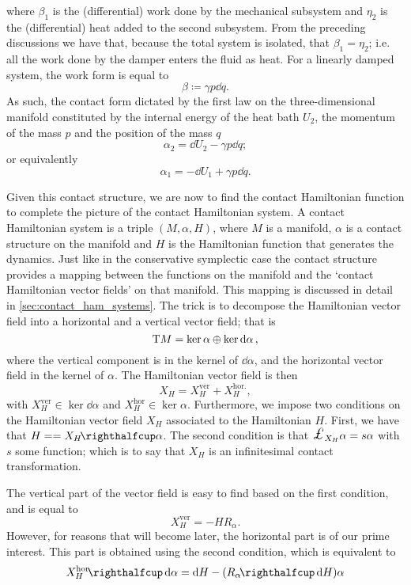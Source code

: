where $\beta_1$ is the (differential) work done by the mechanical subsystem and $\eta_2$ is the (differential) heat added to the second subsystem. From the preceding discussions we have that, because the total system is isolated, that $ \beta_1 = \eta_2 $; i.e. all the work done by the damper enters the fluid as heat. For a linearly damped system, the work form is equal to 
$$ \beta \coloneq \gamma p \dd{q}. $$
As such, the contact form dictated by the first law on the three-dimensional manifold constituted by the internal energy of the heat bath $U_2$, the momentum of the mass $p$ and the position of the mass $q$
\begin{equation}
    \alpha_2 = \dd{U}_2 - \gamma p \dd{q};
    \label{eq:dho_contact_form_thermo}
\end{equation}
or equivalently
\begin{equation*}
    \alpha_1 = -\dd{U}_1 + \gamma p \dd{q}.
\end{equation*}

Given this contact structure, we are now to find the contact Hamiltonian function to complete the picture of the contact Hamiltonian system. A contact Hamiltonian system is a triple $(M, \alpha, H)$, where $M$ is a manifold, $\alpha$ is a contact structure on the manifold and $H$ is the Hamiltonian function that generates the dynamics. Just like in the conservative symplectic case the contact structure provides a mapping between the functions on the manifold and the `contact Hamiltonian vector fields' on that manifold. This mapping is discussed in detail in \cref{sec:contact_ham_systems}. The trick is to decompose the Hamiltonian vector field into a horizontal and a vertical vector field; that is
$$ \mathrm{T}M = \ker \alpha \oplus \ker \dd{\alpha},$$
where the vertical component is in the kernel of $ \dd{\alpha}$, and the horizontal vector field in the kernel of $ \alpha $. The Hamiltonian vector field is then 
$$ X_H = X_H^\text{ver} + X_H^\text{hor.}, $$
with $X_H^\text{ver} \in \ker \dd{\alpha}$ and $X_H^\text{hor} \in \ker \alpha$.
Furthermore, we impose two conditions on the Hamiltonian vector field $X_H$ associated to the Hamiltonian $H$. First, we have that $ H = = \intpr{X_H}{\alpha} $. The second condition is that $\lied{X_H}\alpha = s \alpha $ with $s$ some function; which is to say that $X_H$ is an infinitesimal contact transformation. 

The vertical part of the vector field is easy to find based on the first condition, and is equal to
$$ X_H^\text{ver} = -H R_\alpha. $$
However, for reasons that will become later, the horizontal part is of our prime interest. This part is obtained using the second condition, which is equivalent to
\begin{equation}
    \intpr{X_H^\text{hor}}{\dd{\alpha}} = \dd{H} - (\intpr{R_\alpha}{\dd{H}}) \alpha 
    \label{eq:hor_vfield_condition}
\end{equation}

